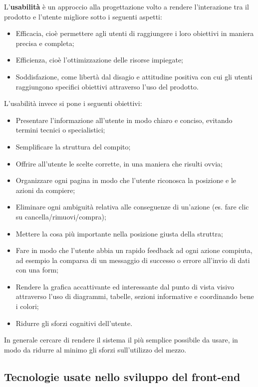 L'\textbf{usabilità} è un approccio alla progettazione volto a rendere l'interazione tra il prodotto e l'utente migliore sotto i seguenti aspetti:
\begin{itemize}
    \item Efficacia, cioè permettere agli utenti di raggiungere i loro obiettivi in maniera precisa e completa;
    \item Efficienza, cioè l'ottimizzazione delle risorse impiegate;
    \item Soddisfazione, come libertà dal disagio e attitudine positiva con cui gli utenti raggiungono specifici obiettivi attraverso l’uso del prodotto.
\end{itemize}
L'usabilità invece si pone i seguenti obiettivi:
\begin{itemize}
    \item Presentare l'informazione all'utente in modo chiaro e conciso, evitando termini tecnici o specialistici;
    \item Semplificare la struttura del compito;
    \item Offrire all'utente le scelte corrette, in una maniera che risulti ovvia;
    \item Organizzare ogni pagina in modo che l'utente riconosca la posizione e le azioni da compiere;
    \item Eliminare ogni ambiguità relativa alle conseguenze di un'azione (es. fare clic su cancella/rimuovi/compra);
    \item Mettere la cosa più importante nella posizione giusta della struttra;
    \item Fare in modo che l'utente abbia un rapido feedback ad ogni azione compiuta, ad esempio la comparsa di un messaggio di successo o errore all'invio di dati con una form;
    \item Rendere la grafica accattivante ed interessante dal punto di vista visivo attraverso l'uso di diagrammi, tabelle, sezioni informative e coordinando bene i colori;
    \item Ridurre gli sforzi cognitivi dell'utente.
\end{itemize}
In generale cercare di rendere il sistema il più semplice possibile da usare, in modo da ridurre al minimo gli sforzi sull'utilizzo del mezzo.


\subsection{Tecnologie usate nello sviluppo del front-end}

